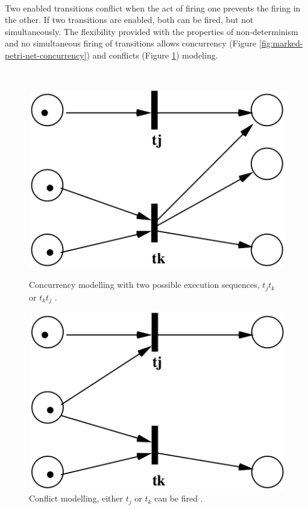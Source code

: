 \documentclass[12pt,english]{article} %
\begin{document}
\

Two enabled transitions conflict when the act of firing one prevents the firing in the other.
If two transitions are enabled, both can be fired, but not simultaneously.
The flexibility provided with the properties of non-determinism and no simultaneous firing of transitions allows concurrency (Figure \ref{fig:marked-petri-net-concurrency}) and conflicts (Figure \ref{fig:marked-petri-net-conflict}) modeling.

\

\begin{figure}[h]
    \centering
    \begin{minipage}[t]{.45\textwidth}
      \centering
      \includegraphics[width=0.725\linewidth]{img/petri-net/mpn/marked-petri-net-concurrency.png}
      \caption{Concurrency modelling with two possible execution sequences, $t_j t_k$ or $t_k t_j$ \cite{lecture-notes-concurrent-systems-validation}.}
      \label{fig:marked-petri-net-concurrency}
    \end{minipage}
    \hspace{0.3cm}
    \begin{minipage}[t]{.45\textwidth}
      \centering
      \includegraphics[width=0.725\linewidth]{img/petri-net/mpn/conflict/marked-petri-net-conflict.png}
      \caption{Conflict modelling, either $t_j$ or $t_k$ can be fired \cite{lecture-notes-concurrent-systems-validation}.}
      \label{fig:marked-petri-net-conflict}
    \end{minipage}
\end{figure}
\end{document}
